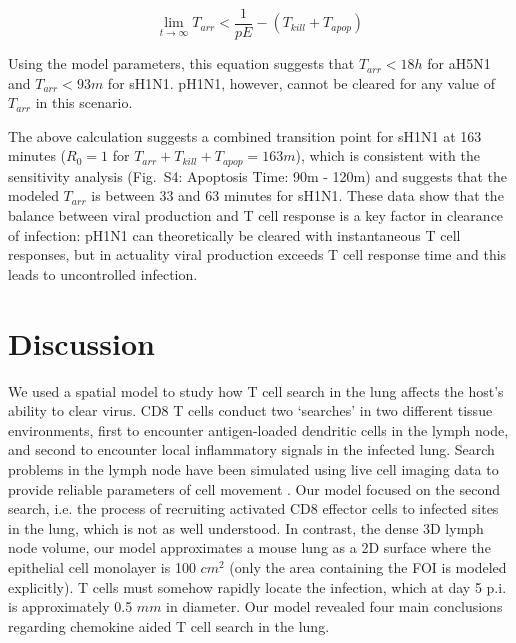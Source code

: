\documentclass[10pt]{article}
\begin{document}
\begin{equation}
\lim_{t \to \infty} T_{arr} < \frac{1}{pE} - (T_{kill} + T_{apop})
\end{equation}

Using the model parameters, this equation suggests that $T_{arr} < 18h$ for aH5N1 and $T_{arr} < 93m$ for sH1N1.  pH1N1, however, cannot be cleared for any value of $T_{arr}$ in this scenario.  

The above calculation suggests a combined transition point for sH1N1 at 163 minutes ($R_0 = 1$ for $T_{arr}+T_{kill}+T_{apop}=163m$), which is consistent with the sensitivity analysis (Fig.~S4: Apoptosis Time: 90m - 120m) and suggests that the modeled $T_{arr}$ is between 33 and 63 minutes for sH1N1.  These data show that the balance between viral production and T cell response is a key factor in clearance of infection: pH1N1 can theoretically be cleared with instantaneous T cell responses, but in actuality viral production exceeds T cell response time and this leads to uncontrolled infection.


\section*{Discussion}

We used a spatial model to study how T cell search in the lung affects the host's ability to clear virus.  CD8 T cells conduct two `searches' in two different tissue environments, first to encounter antigen-loaded dendritic cells in the lymph node, and second to encounter local inflammatory signals in the infected lung.  Search problems in the lymph node have been simulated using live cell imaging data to provide reliable parameters of cell movement \cite{Vroomans2012}.  Our model focused on the second search, i.e. the process of recruiting activated CD8 effector cells to infected sites in the lung, which is not as well understood.  In contrast, the dense 3D lymph node volume, our model approximates a mouse lung as a 2D surface where the epithelial cell monolayer is 100 $cm^2$ (only the area containing the FOI is modeled explicitly).  T cells must somehow rapidly locate the infection, which at day 5 p.i. is approximately 0.5 $mm$ in diameter.  Our model revealed four main conclusions regarding chemokine aided T cell search in the lung.
\end{document}
